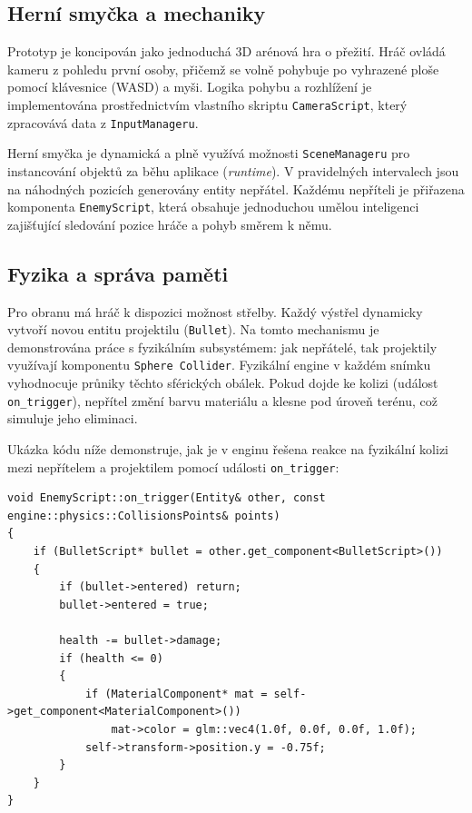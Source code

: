 \documentclass[12pt,a4paper]{article}
\begin{document}
\subsection{Herní smyčka a mechaniky}
Prototyp je koncipován jako jednoduchá 3D arénová hra o přežití. Hráč ovládá kameru z pohledu první osoby, přičemž se volně pohybuje po vyhrazené ploše pomocí klávesnice (WASD) a myši. Logika pohybu a rozhlížení je implementována prostřednictvím vlastního skriptu \texttt{CameraScript}, který zpracovává data z \texttt{InputManageru}.

Herní smyčka je dynamická a plně využívá možnosti \texttt{SceneManageru} pro instancování objektů za běhu aplikace (\textit{runtime}). V pravidelných intervalech jsou na náhodných pozicích generovány entity nepřátel. Každému nepříteli je přiřazena komponenta \texttt{EnemyScript}, která obsahuje jednoduchou umělou inteligenci zajišťující sledování pozice hráče a pohyb směrem k němu.

\subsection{Fyzika a správa paměti}
Pro obranu má hráč k dispozici možnost střelby. Každý výstřel dynamicky vytvoří novou entitu projektilu (\texttt{Bullet}). Na tomto mechanismu je demonstrována práce s fyzikálním subsystémem: jak nepřátelé, tak projektily využívají komponentu \texttt{Sphere Collider}. Fyzikální engine v každém snímku vyhodnocuje průniky těchto sférických obálek. Pokud dojde ke kolizi (událost \texttt{on\_trigger}), nepřítel změní barvu materiálu a klesne pod úroveň terénu, což simuluje jeho eliminaci.

Ukázka kódu níže demonstruje, jak je v enginu řešena reakce na fyzikální kolizi mezi nepřítelem a projektilem pomocí události \texttt{on\_trigger}:

\begin{lstlisting}[caption={Reakce na kolizi v komponentě EnemyScript}]
void EnemyScript::on_trigger(Entity& other, const engine::physics::CollisionsPoints& points)
{
    if (BulletScript* bullet = other.get_component<BulletScript>())
    {
        if (bullet->entered) return;
        bullet->entered = true;

        health -= bullet->damage;
        if (health <= 0)
        {
            if (MaterialComponent* mat = self->get_component<MaterialComponent>())
                mat->color = glm::vec4(1.0f, 0.0f, 0.0f, 1.0f);
            self->transform->position.y = -0.75f;
        }
    }
}
\end{lstlisting}
\end{document}
